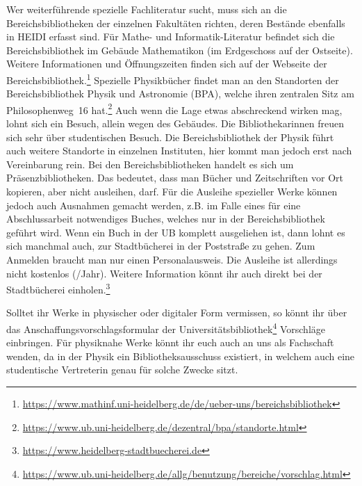 Wer weiterführende spezielle Fachliteratur sucht, muss sich an die Bereichsbibliotheken der einzelnen Fakultäten richten, deren Bestände ebenfalls in \gls{HEIDI} erfasst sind. Für Mathe- und Informatik-Literatur befindet sich die Bereichsbibliothek im Gebäude \gls{Mathematikon} (im Erdgeschoss auf der Ostseite). Weitere Informationen und Öffnungszeiten finden sich auf der Webseite der Bereichsbibliothek.\footnote{\url{https://www.mathinf.uni-heidelberg.de/de/ueber-uns/bereichsbibliothek}} Spezielle Physikbücher findet man an den Standorten der Bereichsbibliothek Physik und Astronomie (BPA), welche ihren zentralen Sitz am Philosophenweg~16 hat.\footnote{\url{https://www.ub.uni-heidelberg.de/dezentral/bpa/standorte.html}} Auch wenn die Lage etwas abschreckend wirken mag, lohnt sich ein Besuch, allein wegen des Gebäudes. Die Bibliothekarinnen freuen sich sehr über studentischen Besuch. Die Bereichsbibliothek der Physik führt auch weitere Standorte in einzelnen Instituten, hier kommt man jedoch erst nach Vereinbarung rein.
Bei den Bereichsbibliotheken handelt es sich um Präsenzbibliotheken. Das bedeutet, dass man Bücher und Zeitschriften vor Ort kopieren, aber nicht ausleihen, darf. Für die Ausleihe spezieller Werke können jedoch auch Ausnahmen gemacht werden, z.B. im Falle eines für eine Abschlussarbeit notwendiges Buches, welches nur in der Bereichsbibliothek geführt wird.
Wenn ein Buch in der UB komplett ausgeliehen ist, dann lohnt es sich manchmal auch, zur Stadtbücherei in der Poststraße zu gehen. Zum Anmelden braucht man nur einen Personalausweis. Die Ausleihe ist allerdings nicht kostenlos (/Jahr). Weitere Information könnt ihr auch direkt bei der Stadtbücherei einholen.\footnote{\url{https://www.heidelberg-stadtbuecherei.de}}

Solltet ihr Werke in physischer oder digitaler Form vermissen, so könnt ihr über das Anschaffungsvorschlagsformular der Universitätsbibliothek\footnote{\url{https://www.ub.uni-heidelberg.de/allg/benutzung/bereiche/vorschlag.html}} Vorschläge einbringen. Für physiknahe Werke könnt ihr euch auch an uns als Fachschaft wenden, da in der Physik ein Bibliotheksausschuss existiert, in welchem auch eine studentische Vertreterin genau für solche Zwecke sitzt.



%

